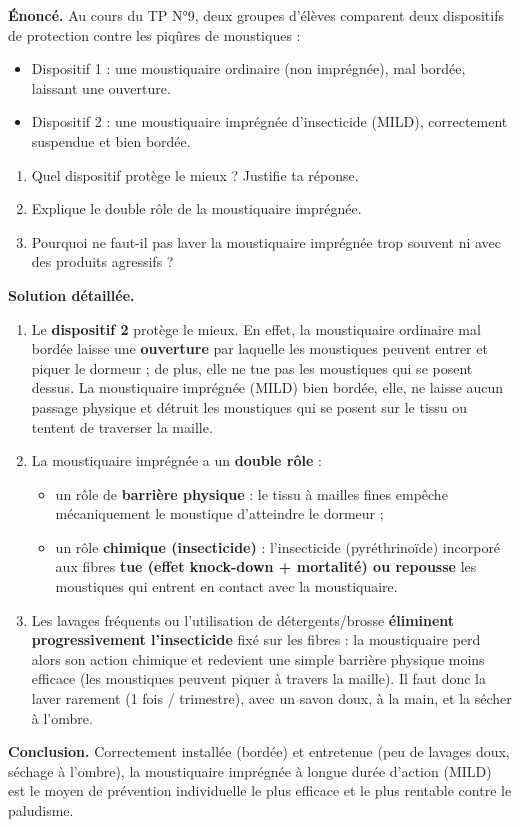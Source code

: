 \documentclass[11pt]{article}
\begin{document}
\begin{exoresolu}
\textbf{Énoncé.} Au cours du TP N°9, deux groupes d'élèves comparent deux dispositifs de protection contre les piqûres de moustiques :
\begin{itemize}
\item Dispositif 1 : une moustiquaire ordinaire (non imprégnée), mal bordée, laissant une ouverture.
\item Dispositif 2 : une moustiquaire imprégnée d'insecticide (MILD), correctement suspendue et bien bordée.
\end{itemize}
\begin{enumerate}
\item Quel dispositif protège le mieux ? Justifie ta réponse.
\item Explique le double rôle de la moustiquaire imprégnée.
\item Pourquoi ne faut-il pas laver la moustiquaire imprégnée trop souvent ni avec des produits agressifs ?
\end{enumerate}
\tcblower
\textbf{Solution détaillée.}
\begin{enumerate}
\item Le \textbf{dispositif 2} protège le mieux. En effet, la moustiquaire ordinaire mal bordée laisse une \textbf{ouverture} par laquelle les moustiques peuvent entrer et piquer le dormeur ; de plus, elle ne tue pas les moustiques qui se posent dessus. La moustiquaire imprégnée (MILD) bien bordée, elle, ne laisse aucun passage physique et détruit les moustiques qui se posent sur le tissu ou tentent de traverser la maille.
\item La moustiquaire imprégnée a un \textbf{double rôle} :
\begin{itemize}
\item un rôle de \textbf{barrière physique} : le tissu à mailles fines empêche mécaniquement le moustique d'atteindre le dormeur ;
\item un rôle \textbf{chimique (insecticide)} : l'insecticide (pyréthrinoïde) incorporé aux fibres \textbf{tue (effet knock-down + mortalité) ou repousse} les moustiques qui entrent en contact avec la moustiquaire.
\end{itemize}
\item Les lavages fréquents ou l'utilisation de détergents/brosse \textbf{éliminent progressivement l'insecticide} fixé sur les fibres : la moustiquaire perd alors son action chimique et redevient une simple barrière physique moins efficace (les moustiques peuvent piquer à travers la maille). Il faut donc la laver rarement (1 fois / trimestre), avec un savon doux, à la main, et la sécher à l'ombre.
\end{enumerate}
\textbf{Conclusion.} Correctement installée (bordée) et entretenue (peu de lavages doux, séchage à l'ombre), la moustiquaire imprégnée à longue durée d'action (MILD) est le moyen de prévention individuelle le plus efficace et le plus rentable contre le paludisme.
\end{exoresolu}
\end{document}
